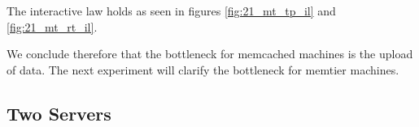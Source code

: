             The interactive law holds as seen in figures \ref{fig:21_mt_tp_il} and \ref{fig:21_mt_rt_il}.

            We conclude therefore that the bottleneck for memcached machines is the upload of data. The next
            experiment will clarify the bottleneck for memtier machines.


    \subsection{Two Servers\label{subsec:2_two-servers}}


